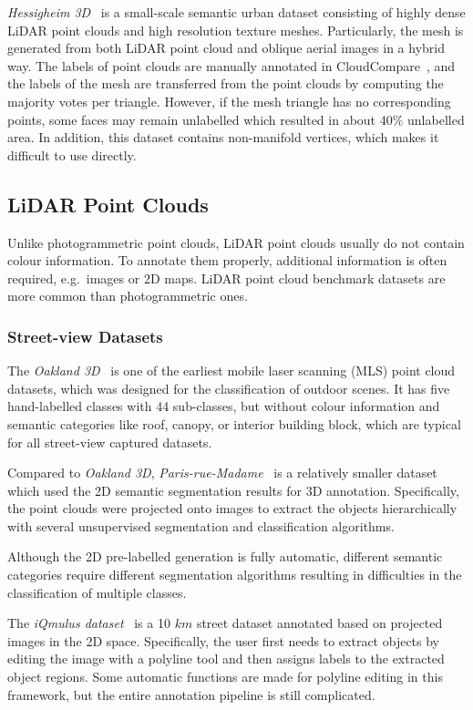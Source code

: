 \emph{Hessigheim 3D}~\citep{laupheimer2020association,kolle2021h3d} is a small-scale semantic urban dataset consisting of highly dense LiDAR point clouds and high resolution texture meshes.
Particularly, the mesh is generated from both LiDAR point cloud and oblique aerial images in a hybrid way.
The labels of point clouds are manually annotated in CloudCompare~\citep{Girardeau-Montaut2016}, and the labels of the mesh are transferred from the point clouds by computing the majority votes per triangle.
However, if the mesh triangle has no corresponding points, some faces may remain unlabelled which resulted in about 40\% unlabelled area.
In addition, this dataset contains non-manifold vertices, which makes it difficult to use directly. 

\subsection{LiDAR Point Clouds}
Unlike photogrammetric point clouds, LiDAR point clouds usually do not contain colour information.
To annotate them properly, additional information is often required, e.g.\ images or 2D maps.
LiDAR point cloud benchmark datasets are more common than photogrammetric ones.

\subsubsection{Street-view Datasets}
The \emph{Oakland 3D}~\citep{munoz2009contextual} is one of the earliest mobile laser scanning (MLS) point cloud datasets, which was designed for the classification of outdoor scenes. 
It has five hand-labelled classes with 44 sub-classes, but without colour information and semantic categories like roof, canopy, or interior building block, which are typical for all street-view captured datasets.

Compared to \emph{Oakland 3D}, \emph{Paris-rue-Madame}~\citep{serna2014paris} is a relatively smaller dataset which used the 2D semantic segmentation results for 3D annotation.
Specifically, the point clouds were projected onto images to extract the objects hierarchically with several unsupervised segmentation and classification algorithms.

Although the 2D pre-labelled generation is fully automatic, different semantic categories require different segmentation algorithms resulting in difficulties in the classification of multiple classes. 

The \emph{iQmulus dataset}~\citep{vallet2015terramobilita} is a 10 $ km $ street dataset annotated based on projected images in the 2D space. 
Specifically, the user first needs to extract objects by editing the image with a polyline tool and then assigns labels to the extracted object regions.  
Some automatic functions are made for polyline editing in this framework, but the entire annotation pipeline is still complicated.


